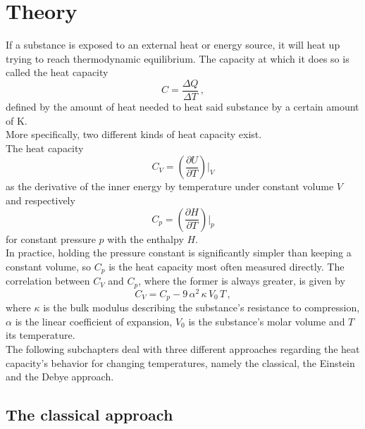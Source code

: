 \section{Theory}
\label{sec:theorie}

If a substance is exposed to an external heat or energy source,
it will heat up trying to reach thermodynamic equilibrium.
The capacity at which it does so is called the heat capacity
\begin{equation}
    C = \frac{\Delta Q}{\Delta T} \,,
    \label{eq:heat_cap}
\end{equation}
defined by the amount of heat needed to heat said substance by a certain amount of
$\si{\kelvin}$. \\

More specifically, two different kinds of heat capacity exist. \\
The heat capacity 
\begin{equation*}
    C_{V} = \left( \frac{\partial U}{\partial T} \right) \big \vert _V
\end{equation*}
as the derivative of the inner energy by temperature under constant volume $V$ and respectively
\begin{equation*}
    C_{p} = \left( \frac{\partial H}{\partial T} \right) \big \vert _p
\end{equation*}
for constant pressure $p$ with the enthalpy $H$. \\

In practice, holding the pressure constant is significantly simpler than keeping a constant volume, so $C_p$ is the heat capacity most often measured directly.
The correlation between $C_V$ and $C_p$, where the former is always greater, is given by
\begin{equation}
    C_V = C_p - 9 \, \alpha^2 \, \kappa \, V_0 \, T \,,
    \label{eq:CVtoCp}
\end{equation}
where $ \kappa $ is the bulk modulus describing the substance's resistance to compression, $\alpha$ is the linear coefficient of expansion, $V_0$ is the substance's molar volume and $T$ its temperature. \\

The following subchapters deal with three different approaches regarding the heat capacity's behavior for changing temperatures, namely the classical, the Einstein and the Debye approach.

\subsection{The classical approach}


